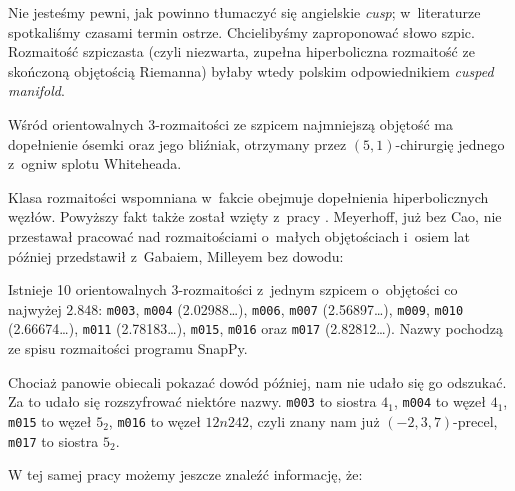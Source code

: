 Nie jesteśmy pewni, jak powinno tłumaczyć się  angielskie \emph{cusp}; w~literaturze spotkaliśmy czasami termin ostrze.
%
Chcielibyśmy zaproponować słowo szpic.
Rozmaitość szpiczasta (czyli niezwarta, zupełna hiperboliczna rozmaitość ze skończoną objętością Riemanna) byłaby wtedy polskim odpowiednikiem \emph{cusped manifold}.

\begin{proposition}
%
    Wśród orientowalnych 3-rozmaitości ze szpicem najmniejszą objętość ma dopełnienie ósemki oraz jego bliźniak, otrzymany przez $(5, 1)$-chirurgię jednego z~ogniw splotu Whiteheada.
%
\end{proposition}

Klasa rozmaitości wspomniana w~fakcie obejmuje dopełnienia hiperbolicznych węzłów.
Powyższy fakt także został wzięty z~pracy \cite{cao2001}.
Meyerhoff, już bez Cao, nie przestawał pracować nad rozmaitościami o~małych objętościach i~osiem lat później przedstawił z~Gabaiem, Milleyem \cite{meyerhoff2009} bez dowodu:
%
%

\begin{proposition}
%
    Istnieje 10 orientowalnych 3-rozmaitości z~jednym szpicem o~objętości co najwyżej $2.848$: \texttt{m003}, \texttt{m004} (2.02988\ldots), \texttt{m006}, \texttt{m007} (2.56897\ldots), \texttt{m009}, \texttt{m010} (2.66674\ldots), \texttt{m011} (2.78183\ldots), \texttt{m015}, \texttt{m016} oraz \texttt{m017} (2.82812\ldots).
    Nazwy pochodzą ze spisu rozmaitości programu SnapPy.
\end{proposition}

Chociaż panowie obiecali pokazać dowód później, nam nie udało się go odszukać.
Za to udało się rozszyfrować niektóre nazwy.
\texttt{m003} to siostra $4_1$, %
\texttt{m004} to węzeł $4_1$, %
\texttt{m015} to węzeł $5_2$,
\texttt{m016} to węzeł $12n242$, czyli znany nam już $(-2, 3, 7)$-precel,
%
\texttt{m017} to siostra $5_2$. %

W tej samej pracy możemy jeszcze znaleźć informację, że:

